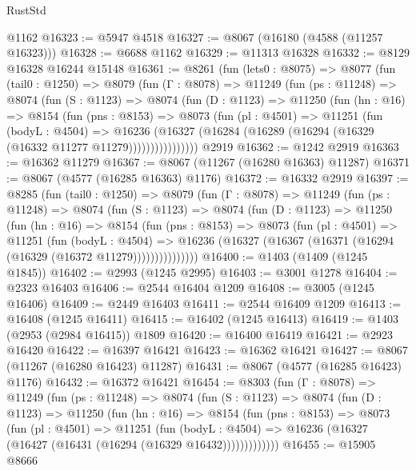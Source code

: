 \begin{lexlean}{RustStd}
\begin{coremodule}
    @1162
@16323 := @5947 @4518
@16327 := @8067 (@16180 (@4588 (@11257 @16323)))
@16328 := @6688 @1162
@16329 := @11313 @16328
@16332 := @8129 @16328 @16244 @15148
@16361 := @8261
    (fun (lets0 : @8075) =>
    @8077
      (fun (tail0 : @1250) =>
      @8079
        (fun (Γ : @8078) =>
        @11249
          (fun (ps : @11248) =>
          @8074
            (fun (S : @1123) =>
            @8074
              (fun (D : @1123) =>
              @11250
                (fun (hn : @16) =>
                @8154
                  (fun (pns : @8153) =>
                  @8073
                    (fun (pl : @4501) =>
                    @11251
                      (fun (bodyL : @4504) =>
                      @16236
                        (@16327
                          (@16284 (@16289 (@16294 (@16329 (@16332 @11277 @11279))))))))))))))))
    @2919
@16362 := @1242 @2919
@16363 := @16362 @11279
@16367 := @8067 (@11267 (@16280 @16363) @11287)
@16371 := @8067 (@4577 (@16285 @16363) @1176)
@16372 := @16332 @2919
@16397 := @8285
    (fun (tail0 : @1250) =>
    @8079
      (fun (Γ : @8078) =>
      @11249
        (fun (ps : @11248) =>
        @8074
          (fun (S : @1123) =>
          @8074
            (fun (D : @1123) =>
            @11250
              (fun (hn : @16) =>
              @8154
                (fun (pns : @8153) =>
                @8073
                  (fun (pl : @4501) =>
                  @11251
                    (fun (bodyL : @4504) =>
                    @16236 (@16327 (@16367 (@16371 (@16294 (@16329 (@16372 @11279)))))))))))))))
@16400 := @1403 (@1409 (@1245 @1845))
@16402 := @2993 (@1245 @2995)
@16403 := @3001 @1278
@16404 := @2323 @16403
@16406 := @2544 @16404 @1209
@16408 := @3005 (@1245 @16406)
@16409 := @2449 @16403
@16411 := @2544 @16409 @1209
@16413 := @16408 (@1245 @16411)
@16415 := @16402 (@1245 @16413)
@16419 := @1403 (@2953 (@2984 @16415)) @1809
@16420 := @16400 @16419
@16421 := @2923 @16420
@16422 := @16397 @16421
@16423 := @16362 @16421
@16427 := @8067 (@11267 (@16280 @16423) @11287)
@16431 := @8067 (@4577 (@16285 @16423) @1176)
@16432 := @16372 @16421
@16454 := @8303
    (fun (Γ : @8078) =>
    @11249
      (fun (ps : @11248) =>
      @8074
        (fun (S : @1123) =>
        @8074
          (fun (D : @1123) =>
          @11250
            (fun (hn : @16) =>
            @8154
              (fun (pns : @8153) =>
              @8073
                (fun (pl : @4501) =>
                @11251
                  (fun (bodyL : @4504) =>
                  @16236 (@16327 (@16427 (@16431 (@16294 (@16329 @16432)))))))))))))
@16455 := @15905 @8666

\end{coremodule}
\end{lexlean}
